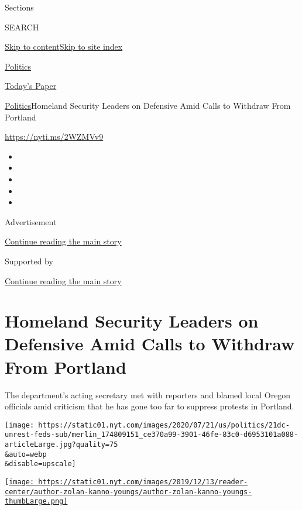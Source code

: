 Sections

SEARCH

\protect\hyperlink{site-content}{Skip to
content}\protect\hyperlink{site-index}{Skip to site index}

\href{https://www.nytimes.com/section/politics}{Politics}

\href{https://myaccount.nytimes.com/auth/login?response_type=cookie\&client_id=vi}{}

\href{https://www.nytimes.com/section/todayspaper}{Today's Paper}

\href{/section/politics}{Politics}\textbar{}Homeland Security Leaders on
Defensive Amid Calls to Withdraw From Portland

\url{https://nyti.ms/2WZMVv9}

\begin{itemize}
\item
\item
\item
\item
\item
\end{itemize}

Advertisement

\protect\hyperlink{after-top}{Continue reading the main story}

Supported by

\protect\hyperlink{after-sponsor}{Continue reading the main story}

\hypertarget{homeland-security-leaders-on-defensive-amid-calls-to-withdraw-from-portland}{%
\section{Homeland Security Leaders on Defensive Amid Calls to Withdraw
From
Portland}\label{homeland-security-leaders-on-defensive-amid-calls-to-withdraw-from-portland}}

The department's acting secretary met with reporters and blamed local
Oregon officials amid criticism that he has gone too far to suppress
protests in Portland.

\texttt{[image: https://static01.nyt.com/images/2020/07/21/us/politics/21dc-unrest-feds-sub/merlin\_174809151\_ce370a99-3901-46fe-83c0-d6953101a088-articleLarge.jpg?quality=75\\\&auto=webp\\\&disable=upscale]}

\href{https://www.nytimes.com/by/zolan-kanno-youngs}{\texttt{[image: https://static01.nyt.com/images/2019/12/13/reader-center/author-zolan-kanno-youngs/author-zolan-kanno-youngs-thumbLarge.png]}}

